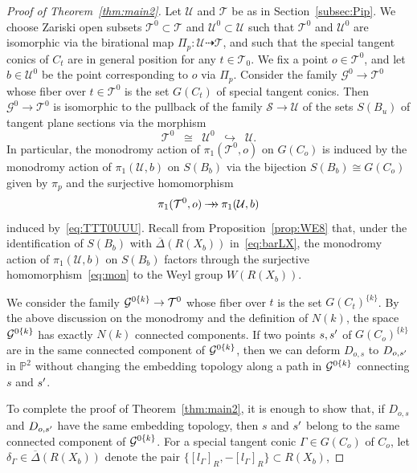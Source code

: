 \documentclass{math}
\theoremstyle{plain}
\numberwithin{equation}{section}
\newcommand{\PP}{\mathord{\mathbb  P}}
\newcommand{\GGG}{\mathord{\mathcal G}}
\newcommand{\SSS}{\mathord{\mathcal S}}
\newcommand{\TTT}{\mathord{\mathcal T}}
\newcommand{\UUU}{\mathord{\mathcal U}}
\newcommand{\inj}{\hookrightarrow}
\newcommand{\surj}{\mathbin{\to \hskip -7pt \to}}
\newcommand{\sprime}{\sp{\prime}}
\newcommand{\pione}{\pi_1}
\newcommand{\spset}[1]{^{\{#1\}}}
\newcommand{\birat}{\dashrightarrow}
\newcommand{\barDelta}{\overline{\Delta}}
\begin{document}
 \begin{proof}[Proof of Theorem~\ref{thm:main2}]
 Let $\UUU$ and $\TTT$ be as in Section~\ref{subsec:Pip}.
 We choose Zariski open subsets $\TTT^0\subset \TTT$ and $\UUU^0\subset \UUU$
such that $\TTT^0$ and $\UUU^0$ are isomorphic via the birational map
$\Pi_p\colon \UUU\birat \TTT$,  
and such that
the special tangent conics of $C_t$ are 
in general position for any $t\in \TTT_0$.
We fix a  point $o\in \TTT^0$, 
and let $b\in \UUU^0$ be the  point corresponding to $o$ via $\Pi_p$. 
Consider the family  $\GGG^0\to \TTT^0$
whose fiber over $t\in  \TTT^0$ is the set  $G(C_t)$ of special tangent conics. 
Then $\GGG^0\to \TTT^0$ is 
isomorphic to the pullback 
of the family $\SSS \to \UUU$
of the sets $S (B_u)$ of tangent plane sections 
via the morphism
%
\begin{equation}\label{eq:TTT0UUU}
\TTT^0\;\;\cong\;\; \UUU^0\;\;\inj\;\; \UUU.
\end{equation}
%
In particular,
the monodromy action 
of $\pione(\TTT^0, o)$ on $G(C_o)$ is induced 
by
the monodromy action 
of $\pione(\UUU, b)$ on $S (B_b)$
via the bijection $S (B_b)\cong G(C_o)$ given by $\pi_p$ 
and the surjective homomorphism
\[
\pione(\TTT^0, o)\surj \pione(\UUU, b)
\]
induced by~\eqref{eq:TTT0UUU}.
Recall from Proposition~\ref{prop:WE8} that,
under the identification of $S (B_b)$ with  $\barDelta(R(X_b))$ in~\eqref{eq:barLX}, 
 the monodromy action 
of $\pione(\UUU, b)$ on $S (B_b)$
factors through 
the surjective homomorphism~\eqref{eq:mon}
to the Weyl group $W(R(X_b))$. %
\par
We  consider 
the family $\GGG\sp{0\{k\}} \to \TTT^0$
whose fiber over $t$ is the set $G(C_t)\spset{k}$.
By the above discussion on the monodromy and the definition of $N(k)$, 
the space  $\GGG\sp{0\{k\}}$  has exactly $N(k)$ connected components.
If two points $s, s\sprime$
of $G(C_o)\spset{k}$ are in the same connected component 
of $\GGG\sp{0\{k\}}$,
then we can deform $D_{o,s}$ to   $D_{o, s\sprime}$ in $\PP^2$
without changing the embedding topology
along a path in $\GGG\sp{0\{k\}}$ connecting $s$ and $s\sprime$.
\par
To complete the proof of Theorem~\ref{thm:main2}, it is enough to show that, 
if $D_{o,s}$ and $D_{o, s\sprime}$ have the same embedding topology,
then $s$ and $s\sprime$ belong to the same connected component 
of $\GGG\sp{0\{k\}}$.
For a special tangent conic $\Gamma\in G(C_o)$ of $C_o$,
let $\delta_{\Gamma}\in \barDelta(R(X_b))$ 
denote the pair $\{[l_{\Gamma}]_R, -[l_{\Gamma}]_R\}\subset R(X_b)$,

\end{proof}
\end{document}
